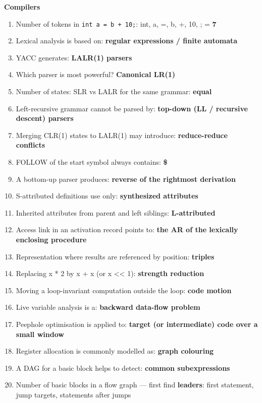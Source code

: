 \textbf{Compilers}

\begin{enumerate}
\def\labelenumi{\arabic{enumi}.}
\setcounter{enumi}{30}
\tightlist
\item
  Number of tokens in \texttt{int\ a\ =\ b\ +\ 10;}: int, a, =, b, +, 10, ; = \textbf{7}
\item
  Lexical analysis is based on: \textbf{regular expressions / finite automata}
\item
  YACC generates: \textbf{LALR(1) parsers}
\item
  Which parser is most powerful? \textbf{Canonical LR(1)}
\item
  Number of states: SLR vs LALR for the same grammar: \textbf{equal}
\item
  Left-recursive grammar cannot be parsed by: \textbf{top-down (LL / recursive descent) parsers}
\item
  Merging CLR(1) states to LALR(1) may introduce: \textbf{reduce-reduce conflicts}
\item
  FOLLOW of the start symbol always contains: \textbf{\$}
\item
  A bottom-up parser produces: \textbf{reverse of the rightmost derivation}
\item
  S-attributed definitions use only: \textbf{synthesized attributes}
\item
  Inherited attributes from parent and left siblings: \textbf{L-attributed}
\item
  Access link in an activation record points to: \textbf{the AR of the lexically enclosing procedure}
\item
  Representation where results are referenced by position: \textbf{triples}
\item
  Replacing x * 2 by x + x (or x \textless\textless{} 1): \textbf{strength reduction}
\item
  Moving a loop-invariant computation outside the loop: \textbf{code motion}
\item
  Live variable analysis is a: \textbf{backward data-flow problem}
\item
  Peephole optimisation is applied to: \textbf{target (or intermediate) code over a small window}
\item
  Register allocation is commonly modelled as: \textbf{graph colouring}
\item
  A DAG for a basic block helps to detect: \textbf{common subexpressions}
\item
  Number of basic blocks in a flow graph --- first find \textbf{leaders}: first statement, jump targets, statements after jumps
\end{enumerate}

